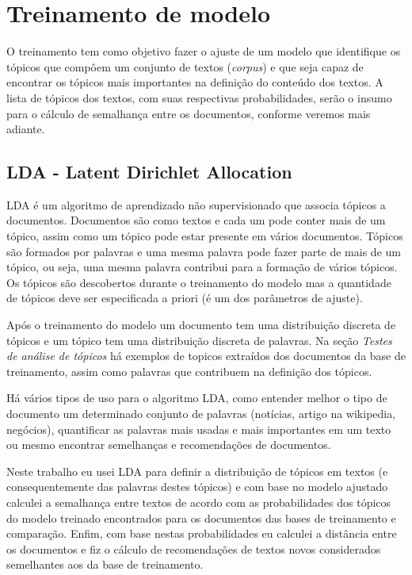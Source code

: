 \section{Treinamento de modelo}

O treinamento tem como objetivo fazer o ajuste de um modelo que identifique os tópicos que compôem um conjunto de textos (\textit{corpus})
e que seja capaz de encontrar os tópicos mais importantes na definição do conteúdo dos textos. A lista de tópicos dos textos, com suas respectivas 
probabilidades, serão o insumo para o cálculo de semalhança entre os documentos, conforme veremos mais adiante.

\subsection{LDA - Latent Dirichlet Allocation}

LDA é um algoritmo de aprendizado não supervisionado que associa tópicos a documentos. Documentos são como textos e cada um pode conter mais de um 
tópico, assim como um tópico pode estar presente em vários documentos. Tópicos são formados por palavras e uma mesma palavra pode fazer parte de mais de um tópico, ou seja, uma mesma palavra contribui para a formação de vários 
tópicos. Os tópicos são descobertos durante o treinamento do modelo mas a quantidade de tópicos deve ser especificada a priori (é um dos parâmetros de ajuste).

Após o treinamento do modelo um documento tem uma distribuição discreta de tópicos e um tópico tem uma distribuição discreta de palavras. Na seção
\textit{Testes de análise de tópicos} há exemplos de topicos extraídos dos documentos da base de treinamento, assim como palavras que contribuem
na definição dos tópicos.

Há vários tipos de uso para o algoritmo LDA, como entender melhor o tipo de documento um determinado conjunto de palavras (notícias, artigo na wikipedia, 
negócios), quantificar as palavras mais usadas e mais importantes em um texto ou mesmo encontrar semelhanças e recomendações de documentos. 

Neste trabalho eu usei LDA para definir a distribuição de tópicos em textos (e consequentemente das palavras destes tópicos) e com base 
no modelo ajustado calculei a semalhança entre textos de acordo com as probabilidades dos tópicos do modelo treinado encontrados para os documentos
das bases de treinamento e comparação. Enfim, com base nestas probabilidades eu calculei a distância entre os documentos e 
fiz o cálculo de recomendações de textos novos considerados semelhantes aos da base de treinamento.

